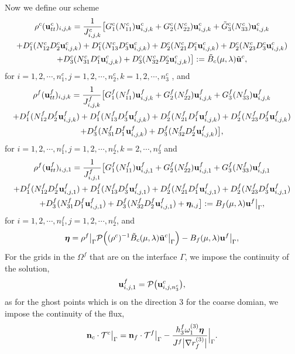 \documentclass[a4paper]{article}
\begin{document}
Now we define our scheme
\begin{multline}\label{coarse_scheme}
\rho^c ({\bf u}_{tt}^c)_{i,j,k} = \frac{1}{J_{i,j,k}^c}\big[G_1^c(N_{11}^c){\bf u}_{i,j,k}^c+G_2^c(N_{22}^c){\bf u}_{i,j,k}^c+\tilde{G}_3^c(N_{33}^c){\bf u}_{i,j,k}^c\\
+D_1^c(N_{12}^cD_2^c{\bf u}_{i,j,k}^c)+D_1^c(N_{13}^cD_3^c{\bf u}_{i,j,k}^c)+D_2^c(N_{21}^cD_1^c{\bf u}_{i,j,k}^c)+D_2^c(N_{23}^cD_3^c{\bf u}_{i,j,k}^c)\\
+D_3^c(N_{31}^cD_1^c{\bf u}_{i,j,k}^c)+D_3^c(N_{32}^cD_2^c{\bf u}_{i,j,k}^c)\big] := \tilde{B}_c(\mu,\lambda) \tilde{\bf{u}}^c,
\end{multline}
for $ i = 1,2,\cdots,n_1^c, j = 1,2,\cdots,n_2^c, k = 1,2,\cdots,n_3^c$ , and 
\begin{multline}\label{fine_scheme_2}
\rho^f ({\bf u}_{tt}^f)_{i,j,k} =
 \frac{1}{J_{i,j,k}^f}\big[G_1^f(N_{11}^f){\bf u}_{i,j,k}^f+G_2^f(N_{22}^f){\bf u}_{i,j,k}^f+G_3^f(N_{33}^f){\bf u}_{i,j,k}^f\\
+D_1^f(N_{12}^fD_2^f{\bf u}_{i,j,k}^f)+D_1^f(N_{13}^fD_3^f{\bf u}_{i,j,k}^f)
+D_2^f(N_{21}^fD_1^f{\bf u}_{i,j,k}^f)+D_2^f(N_{23}^fD_3^f{\bf u}_{i,j,k}^f)\\
+D_3^f(N_{31}^fD_1^f{\bf u}_{i,j,k}^f)
+D_3^f(N_{32}^fD_2^f{\bf u}_{i,j,k}^f)\big],
\end{multline}
for $ i = 1,2,\cdots,n_1^f, j = 1,2,\cdots,n_2^f, k = 2,\cdots,n_3^f$ and
\begin{multline}\label{fine_scheme_1}
\rho^f ({\bf u}_{tt}^f)_{i,j,1} = \frac{1}{J_{i,j,1}^f}\big[G_1^f(N_{11}^f){\bf u}_{i,j,1}^f+G_2^f(N_{22}^f){\bf u}_{i,j,1}^f+G_3^f(N_{33}^f){\bf u}_{i,j,1}^f\\
+D_1^f(N_{12}^fD_2^f{\bf u}_{i,j,1}^f)+D_1^f(N_{13}^fD_3^f{\bf u}_{i,j,1}^f)+D_2^f(N_{21}^fD_1^f{\bf u}_{i,j,1}^f)+D_2^f(N_{23}^fD_3^f{\bf u}_{i,j,1}^f)\\
+D_3^f(N_{31}^fD_1^f{\bf u}_{i,j,1}^f)+D_3^f(N_{32}^fD_2^f{\bf u}_{i,j,1}^f)+{\bm \eta}_{i,j}\big] := B_f(\mu,\lambda){\bf u}^f\big|_\Gamma,
\end{multline}
for $ i = 1,2,\cdots,n_1^f, j = 1,2,\cdots,n_2^f$, and
\begin{equation*}
{\bm \eta} = \rho^f\big|_\Gamma\mathcal{P}\Big((\rho^c)^{-1}\tilde{B}_c(\mu,\lambda)\tilde{\bf u}^c\big|_\Gamma\Big)-B_f(\mu,\lambda){\bf u}^f\big|_\Gamma,
\end{equation*}
For the grids in the $\Omega^f$  that are on the interface $\Gamma$, we impose the continuity of the solution,
\begin{equation*}
{\bf u}_{i,j,1}^f = \mathcal{P}\big({\bf u}_{i,j,n_3^c}^c\big),
\end{equation*}
as for the ghost points which is on the direction 3 for the coarse domian, we impose the continuity of the flux,
\begin{equation*}
{\bf n}_c\cdot\mathcal{T}^c \big|_\Gamma = {\bf n}_f\cdot\mathcal{T}^f\big|_\Gamma - \frac{h_3^f\omega_1^{(3)}{\bm \eta}}{J^f\big|\nabla r_f^{(3)}\big|}\Big|_\Gamma.
\end{equation*}
\end{document}
